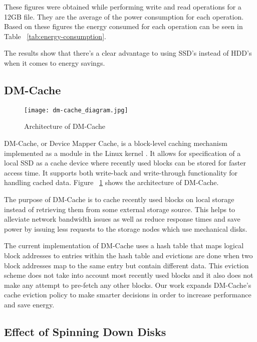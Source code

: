 These figures were obtained while performing write and read operations for a
12GB file. They are the average of the power consumption for each
operation. Based on these figures the energy consumed for each operation can be
seen in Table ~\ref{tab:energy-consumption}.

The results show that there's a clear advantage to using SSD's instead of HDD's
when it comes to energy savings.

\subsection{DM-Cache}

\begin{figure}
  \caption{Architecture of DM-Cache}
  \centering \texttt{[image: dm-cache\_diagram.jpg]}
  \label{fig:dm-cache}
\end{figure}

DM-Cache, or Device Mapper Cache, is a block-level caching mechanism implemented
as a module in the Linux kernel \cite{DM-Cache}. It allows for specification of
a local SSD as a cache device where recently used blocks can be stored for
faster access time. It supports both write-back and write-through functionality
for handling cached data. Figure ~\ref{fig:dm-cache} shows the architecture of
DM-Cache.

The purpose of DM-Cache is to cache recently used blocks on local storage
instead of retrieving them from some external storage source. This helps to
alleviate network bandwidth issues as well as reduce response times and save
power by issuing less requests to the storage nodes which use mechanical disks.

The current implementation of DM-Cache uses a hash table that maps logical block
addresses to entries within the hash table and evictions are done when two block
addresses map to the same entry but contain different data. This eviction scheme
does not take into account most recently used blocks and it also does not make
any attempt to pre-fetch any other blocks. Our work expands DM-Cache's cache
eviction policy to make smarter decisions in order to increase performance and
save energy.

\subsection{Effect of Spinning Down Disks}

